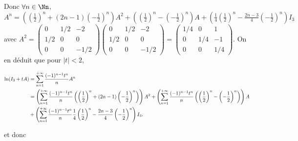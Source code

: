 {{Donc $\forall n\in\Nn$, $A^n=\left(\left( \frac{1}{2}\right)^n+(2n-1)\left(- \frac{1}{2}\right)^n\right)A^2+\left(\left( \frac{1}{2}\right)^n-\left(- \frac{1}{2}\right)^n\right)A+\left( \frac{1}{4}\left( \frac{1}{2}\right)^n- \frac{2n-3}{4}\left(- \frac{1}{2}\right)^n\right)I_3$ avec $A^2=\left(
\begin{array}{ccc}
0&1/2&-2\\
1/2&0&0\\
0&0&-1/2
\end{array}
\right)\left(
\begin{array}{ccc}
0&1/2&-2\\
1/2&0&0\\
0&0&-1/2
\end{array}
\right)=\left(
\begin{array}{ccc}
1/4&0&1\\
0&1/4&-1\\
0&0&1/4
\end{array}
\right)$. On en déduit que pour $|t|<2$,

\begin{align*}\ensuremath
\ln(I_3+tA)&=\sum_{n=1}^{+\infty} \frac{(-1)^{n-1}t^n}{n}A^n\\
 &=\left(\sum_{n=1}^{+\infty} \frac{(-1)^{n-1}t^n}{n}\left(\left( \frac{1}{2}\right)^n+(2n-1)\left(- \frac{1}{2}\right)^n\right)\right)A^2+\left(\sum_{n=1}^{+\infty} \frac{(-1)^{n-1}t^n}{n}\left(\left( \frac{1}{2}\right)^n-\left(- \frac{1}{2}\right)^n\right)\right)A\\
  &+\left(\sum_{n=1}^{+\infty} \frac{(-1)^{n-1}t^n}{n} \frac{1}{4}\left( \frac{1}{2}\right)^n- \frac{2n-3}{4}\left(- \frac{1}{2}\right)^n\right)I_3.
\end{align*}

et donc

}}
